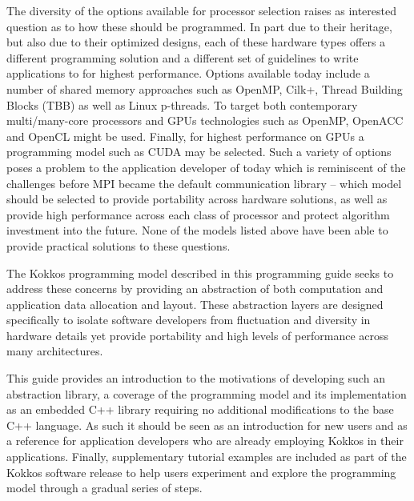 The diversity of the options available for processor selection raises as interested question
as to how these should be programmed. In part due to their heritage, but also due to their
optimized designs, each of these hardware types offers a different programming solution and
a different set of guidelines to write applications to for highest performance. Options available
today include a number of shared memory approaches such as OpenMP, Cilk+, Thread Building Blocks
(TBB) as well as Linux p-threads. To target both contemporary multi/many-core processors and
GPUs technologies such as OpenMP, OpenACC and OpenCL might be used. Finally, for highest
performance on GPUs a 
programming model such as CUDA may be selected. Such a variety of options poses a problem 
to the application
developer of today which is reminiscent of the challenges before MPI became the default
communication library -- which model should be selected to provide portability across hardware
solutions, as well as provide high performance across each class of processor and
protect algorithm investment into the future. None of the models listed above have been able to 
provide practical solutions to these questions.

The Kokkos programming model described in this programming guide seeks to address these
concerns by providing an abstraction of both computation and application data allocation and
layout. These abstraction layers are designed specifically to isolate software developers from
fluctuation and diversity in hardware details yet provide portability and high levels of performance
across many architectures.

This guide provides an introduction to the motivations of developing such an abstraction library,
a coverage of the programming model and its implementation as an embedded C++ library requiring
no additional modifications to the base C++ language. As such it should be seen as an introduction
for new users and as a reference for application developers who are already employing Kokkos
in their applications. Finally, supplementary tutorial examples are included as part of the
Kokkos software release to help users experiment and explore the programming model through a 
gradual series of steps.

